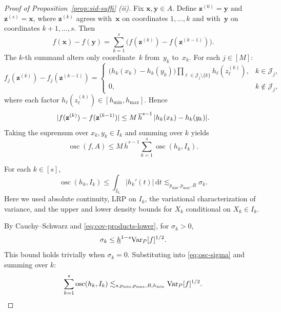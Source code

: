 \documentclass[11pt]{article}
\theoremstyle{plain}
\theoremstyle{definition}
\theoremstyle{remark}
\theoremstyle{plain}
\newcommand{\bx}{\mathbf{x}}
\newcommand{\by}{\mathbf{y}}
\newcommand{\bz}{\mathbf{z}}
\DeclarePairedDelimiter{\abs}{|}{|}
\newcommand{\Var}{\textnormal{Var}}
\newcommand{\1}{\mathbbm{1}}
\begin{document}
\begin{proof}[Proof of Proposition~\ref{prop:sid-suffi} (ii)]
    Fix $\bx, \by \in A$. Define $\bz^{(0)} = \by$ and $\bz^{(s)} = \bx$, where $\bz^{(k)}$ agrees with~$\bx$ on coordinates $1, \ldots, k$ and with~$\by$ on coordinates $k+1, \ldots, s$. Then
    \begin{equation}
      f(\bx) - f(\by)
      = \sum_{k=1}^{s} \bigl(f(\bz^{(k)}) - f(\bz^{(k-1)})\bigr).
    \end{equation}
    The $k$-th summand alters only coordinate~$k$ from~$y_k$ to~$x_k$. For each $j \in [M]$:
    \begin{equation*}
      f_j(\bz^{(k)}) - f_j(\bz^{(k-1)})
      = \begin{cases}
        \bigl(h_k(x_k) - h_k(y_k)\bigr)\displaystyle\prod_{\ell \in \mathcal{J}_j
        \setminus \{k\}} h_\ell(z_\ell^{(k)}),
        & k \in \mathcal{J}_j, \\[4pt]
        0, & k \notin \mathcal{J}_j,
      \end{cases}
    \end{equation*}
    where each factor $h_\ell(z_\ell^{(k)}) \in [h_{\min}, h_{\max}]$.
    Hence
    \begin{equation*}
      \abs{f(\bz^{(k)}) - f(\bz^{(k-1)})}
      \leq M\, \overline h^{s-1}\, \abs{h_k(x_k) - h_k(y_k)}.
    \end{equation*}
    Taking the supremum over $x_k, y_k \in I_k$ and summing over $k$ yields
    \begin{equation}\label{eq:osc-f}
      \operatorname{osc}(f, A) \leq M\, \overline h^{s-1}
      \sum_{k=1}^{s} \operatorname{osc}(h_k, I_k).
    \end{equation}

    For each $k \in [s]$,
    \begin{equation}\label{eq:osc-sigma}
      \operatorname{osc}(h_k, I_k)
      \leq \int_{I_k}|h_k'(t)|\,\mathrm dt
      \lesssim_{p_{\min},p_{\max},R} \sigma_k.
    \end{equation}
    Here we used absolute continuity, LRP on $I_k$, the variational
    characterization of variance, and the upper and lower density bounds for
    $X_k$ conditional on $X_k\in I_k$.

    By Cauchy--Schwarz and \eqref{eq:cov-products-lower}, for $\sigma_k>0$,
    \begin{equation}\label{eq:Sigma-upper}
      \sigma_k \leq \underline h^{1-s}\Var_P[f]^{1/2}.
    \end{equation}
    This bound holds trivially when $\sigma_k = 0$. Substituting into \eqref{eq:osc-sigma} and summing over $k$:
    \begin{equation}\label{eq:sid-2-1}
        \sum_{k=1}^{s} \operatorname{osc}(h_k, I_k)
        \lesssim_{s,p_{\min},p_{\max},R,h_{\min}}
        \Var_P[f]^{1/2}.
    \end{equation}


\end{proof}
\end{document}
